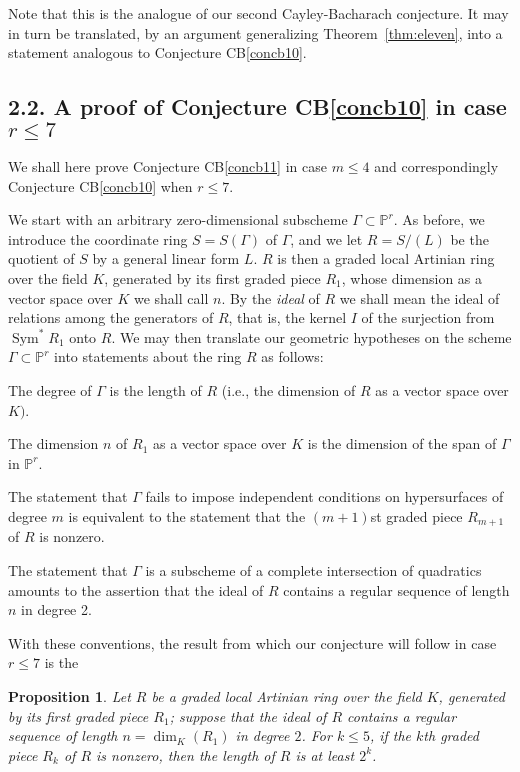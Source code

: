 \documentclass{bull-l}
\newcommand{\Sym}{\operatorname{Sym}}
\newtheorem{prop}{Proposition}
\theoremstyle{pplain}
\theoremstyle{definition}
\begin{document}
Note that this is the analogue of our second Cayley-Bacharach conjecture.  It
may in turn be translated, by an argument generalizing
Theorem~\ref{thm:eleven}, into a statement analogous to Conjecture
CB\ref{concb10}.

\subsection*{{\rm 2.2.} A proof of Conjecture CB\ref{concb10} in case  $r\le 7$}
We shall here prove Conjecture CB\ref{concb11} in case $m\le 4$ and
correspondingly Conjecture CB\ref{concb10} when $r\le 7$.

We start with an arbitrary zero-dimensional subscheme $\Gamma\subset
\mathbb{P}^r$.  As before, we introduce the coordinate ring $S=S(\Gamma)$ of $
\Gamma$, and we let $R=S/(L)$ be the quotient of $S$ by a general linear form
$L$.  $R$ is then a graded local Artinian ring over the field $K$, generated by
its first graded piece $R_1$, whose dimension as a vector space over $K$ we
shall call $n$. By the \emph{ideal} of $R$ we shall mean the ideal of relations
among the generators of $R$, that is, the kernel $I$ of the surjection from
$\Sym^*R_1$ onto $R$.  We may then translate our geometric hypotheses on the
scheme $\Gamma\subset \mathbb{P}^r$ into statements about the ring $R$ as
follows:

The degree of $\Gamma$ is the length of $R$ (i.e., the dimension of $R$ as a
vector space over $K)$.

The dimension $n$ of $R_1$ as a vector space over $K$ is the dimension of the
span of $\Gamma$ in $\mathbb{P}^r$.

The statement that $\Gamma$ fails to impose independent conditions on
hypersurfaces of degree $m$ is equivalent to the statement that the $(m+1)$st
graded piece $R_{m+1}$ of $R$ is nonzero.

The statement that $\Gamma$ is a subscheme of a complete intersection of
quadratics amounts to the assertion that the ideal of $R$ contains a regular 
sequence of length $n$ in degree 2.

With these conventions, the result from which our conjecture will follow in
case $r\le 7$ is the 

\begin{prop} \label{prop:twelve}
Let $R$ be a graded local Artinian ring over the field $K$, generated by its
first graded piece $R_1$\textup{;} suppose that the ideal of $R$ contains a
regular sequence of length $n=\dim_{K}(R_1)$ in degree $2$.  For $k\le 5$, if
the $k$th graded piece $R_k$ of $R$ is nonzero, then the length of $R$ is at
least $2^k$.
\end{prop}
\end{document}
